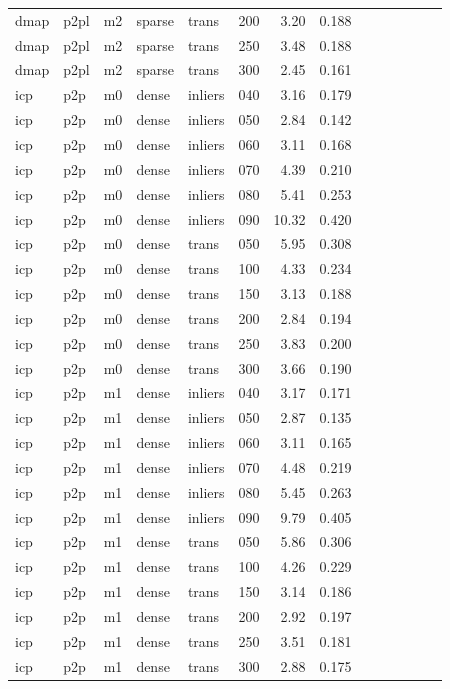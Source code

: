 \begin{table}[htbp]
\begin{tabular}{llllllrrrrrrrr}
  dmap & p2pl & m2 & sparse & trans & 200 & 3.20 & 0.188 \\
  dmap & p2pl & m2 & sparse & trans & 250 & 3.48 & 0.188 \\
  dmap & p2pl & m2 & sparse & trans & 300 & 2.45 & 0.161 \\
  icp & p2p & m0 & dense & inliers & 040 & 3.16 & 0.179 \\
  icp & p2p & m0 & dense & inliers & 050 & 2.84 & 0.142 \\
  icp & p2p & m0 & dense & inliers & 060 & 3.11 & 0.168 \\
  icp & p2p & m0 & dense & inliers & 070 & 4.39 & 0.210 \\
  icp & p2p & m0 & dense & inliers & 080 & 5.41 & 0.253 \\
  icp & p2p & m0 & dense & inliers & 090 & 10.32 & 0.420 \\
  icp & p2p & m0 & dense & trans & 050 & 5.95 & 0.308 \\
  icp & p2p & m0 & dense & trans & 100 & 4.33 & 0.234 \\
  icp & p2p & m0 & dense & trans & 150 & 3.13 & 0.188 \\
  icp & p2p & m0 & dense & trans & 200 & 2.84 & 0.194 \\
  icp & p2p & m0 & dense & trans & 250 & 3.83 & 0.200 \\
  icp & p2p & m0 & dense & trans & 300 & 3.66 & 0.190 \\
  icp & p2p & m1 & dense & inliers & 040 & 3.17 & 0.171 \\
  icp & p2p & m1 & dense & inliers & 050 & 2.87 & 0.135 \\
  icp & p2p & m1 & dense & inliers & 060 & 3.11 & 0.165 \\
  icp & p2p & m1 & dense & inliers & 070 & 4.48 & 0.219 \\
  icp & p2p & m1 & dense & inliers & 080 & 5.45 & 0.263 \\
  icp & p2p & m1 & dense & inliers & 090 & 9.79 & 0.405 \\
  icp & p2p & m1 & dense & trans & 050 & 5.86 & 0.306 \\
  icp & p2p & m1 & dense & trans & 100 & 4.26 & 0.229 \\
  icp & p2p & m1 & dense & trans & 150 & 3.14 & 0.186 \\
  icp & p2p & m1 & dense & trans & 200 & 2.92 & 0.197 \\
  icp & p2p & m1 & dense & trans & 250 & 3.51 & 0.181 \\
  icp & p2p & m1 & dense & trans & 300 & 2.88 & 0.175 \\

\end{tabular}
\end{table}

